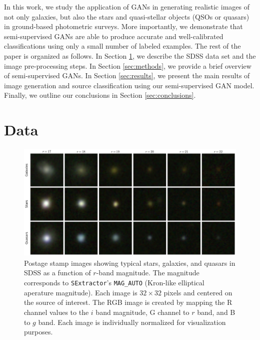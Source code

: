 \documentclass[fleqn,usenatbib]{mnras}
\begin{document}
In this work, we study the application of GANs in generating realistic images of not only galaxies,
but also the stars and quasi-stellar objects (QSOs or quasars) in ground-based photometric surveys.
More importantly, we demonstrate that semi-supervised GANs are able to produce accurate and well-calibrated classifications
using only a small number of labeled examples.
The rest of the paper is organized as follows.
In Section \ref{sec:data}, we describe the SDSS data set and the image pre-processing steps.
In Section \ref{sec:methods}, we provide a brief overview of semi-supervised GANs.
In Section \ref{sec:results}, we present the main results of image generation and source classification using our semi-supervised GAN model.
Finally, we outline our conclusions in Section \ref{sec:conclusions}.

\section{Data}
  \label{sec:data}
  

\begin{figure}
  \centering
  \includegraphics[width=\linewidth]{figures/sdss_stamps.pdf}
  \caption{
    Postage stamp images showing typical stars, galaxies, and quasars in SDSS as a function of $r$-band magnitude.
    The magnitude corresponds to \texttt{SExtractor}'s \texttt{MAG\_AUTO} (Kron-like elliptical aperature magnitude).
    Each image is $32 \times 32$ pixels and centered on the source of interest.
    The RGB image is created by mapping the R channel values to the $i$ band magnitude, G channel to $r$ band, and B to $g$ band.
    Each image is individually normalized for visualization purposes.
  }
  \label{fig:sdss_stamps}
\end{figure}
\end{document}
